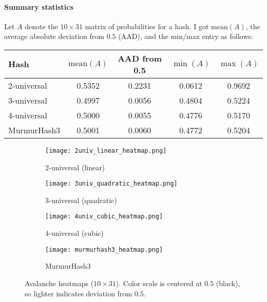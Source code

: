 \documentclass[11pt]{article}
\begin{document}
\paragraph{Summary statistics}
Let \(A\) denote the \(10\times 31\) matrix of probabilities for a hash. I got
\(\text{mean}(A)\), the average absolute deviation from \(0.5\) (AAD), and the min/max entry as follows:

\begin{center}
\begin{tabular}{lcccc}
\toprule
Hash & $\text{mean}(A)$ & AAD from 0.5 & $\min(A)$ & $\max(A)$ \\
\midrule
2-universal      & 0.5352 & 0.2231 & 0.0612 & 0.9692 \\
3-universal      & 0.4997 & 0.0056 & 0.4804 & 0.5224 \\
4-universal      & 0.5000 & 0.0055 & 0.4776 & 0.5170 \\
MurmurHash3      & 0.5001 & 0.0060 & 0.4772 & 0.5204 \\
\bottomrule
\end{tabular}
\end{center}




\begin{figure}[H]
  \centering
  \begin{subfigure}[b]{0.48\linewidth}
    \texttt{[image: 2univ\_linear\_heatmap.png]}
    \caption{2-universal (linear)}
    \label{fig:q1-2univ}
  \end{subfigure}
  \hfill
  \begin{subfigure}[b]{0.48\linewidth}
    \texttt{[image: 3univ\_quadratic\_heatmap.png]}
    \caption{3-universal (quadratic)}
    \label{fig:q1-3univ}
  \end{subfigure}

  \vspace{0.6em}

  \begin{subfigure}[b]{0.48\linewidth}
    \texttt{[image: 4univ\_cubic\_heatmap.png]}
    \caption{4-universal (cubic)}
    \label{fig:q1-4univ}
  \end{subfigure}
  \hfill
  \begin{subfigure}[b]{0.48\linewidth}
    \texttt{[image: murmurhash3\_heatmap.png]}
    \caption{MurmurHash3}
    \label{fig:q1-murmur}
  \end{subfigure}

  \caption{Avalanche heatmaps ($10\times 31$). Color scale is centered at $0.5$ (black), so lighter indicates deviation from $0.5$.}
  \label{fig:q1-heatmaps}
\end{figure}
\end{document}
